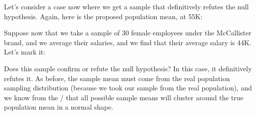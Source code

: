 \documentclass[../../../main.tex]{subfiles}
\begin{document}
Let's consider a case now where we get a sample that definitively refutes the null hypothesis. Again, here is the proposed population mean, at 55K:

\begin{center}
\end{center}

\noindent
Suppose now that we take a sample of 30 female employees under the McCallister brand, and we average their salaries, and we find that their average salary is 44K. Let's mark it:

\begin{center}
\end{center}

\noindent
Does this sample confirm or refute the null hypothesis? In this case, it definitively refutes it. As before, the sample mean must come from the real population sampling distribution (because we took our sample from the real population), and we know from the \CLT/ that all possible sample means will cluster around the true population mean in a normal shape.
\end{document}
